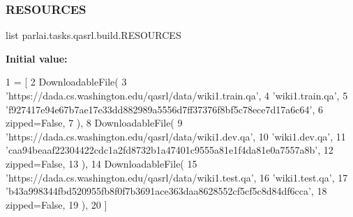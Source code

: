 \subsubsection{\texorpdfstring{R\+E\+S\+O\+U\+R\+C\+ES}{RESOURCES}}
{\footnotesize\ttfamily list parlai.\+tasks.\+qasrl.\+build.\+R\+E\+S\+O\+U\+R\+C\+ES}

{\bfseries Initial value\+:}
\begin{DoxyCode}
1 =  [
2     DownloadableFile(
3         \textcolor{stringliteral}{'https://dada.cs.washington.edu/qasrl/data/wiki1.train.qa'},
4         \textcolor{stringliteral}{'wiki1.train.qa'},
5         \textcolor{stringliteral}{'f927417e94e67b7ae17e33dd882989a5556d7ff37376f8bf5c78ece7d17a6c64'},
6         zipped=\textcolor{keyword}{False},
7     ),
8     DownloadableFile(
9         \textcolor{stringliteral}{'https://dada.cs.washington.edu/qasrl/data/wiki1.dev.qa'},
10         \textcolor{stringliteral}{'wiki1.dev.qa'},
11         \textcolor{stringliteral}{'caa94beaaf22304422cdc1a2fd8732b1a47401c9555a81e1f4da81e0a7557a8b'},
12         zipped=\textcolor{keyword}{False},
13     ),
14     DownloadableFile(
15         \textcolor{stringliteral}{'https://dada.cs.washington.edu/qasrl/data/wiki1.test.qa'},
16         \textcolor{stringliteral}{'wiki1.test.qa'},
17         \textcolor{stringliteral}{'b43a998344fbd520955fb8f0f7b3691ace363daa8628552cf5cf5c8d84df6cca'},
18         zipped=\textcolor{keyword}{False},
19     ),
20 ]
\end{DoxyCode}
